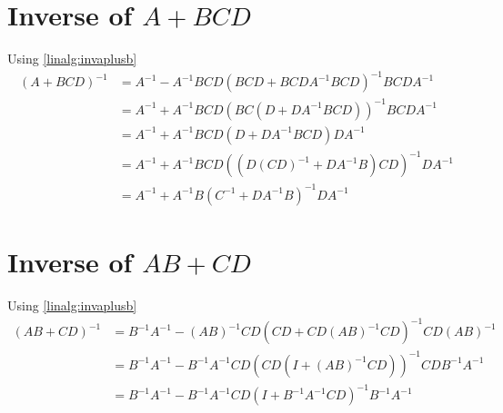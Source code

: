 \section{Inverse of $A+BCD$}
Using \eqref{linalg:invaplusb}
\begin{align}
(A+BCD)^{-1} &= A^{-1}-A^{-1}BCD(BCD + BCDA^{-1}BCD)^{-1}BCDA^{-1} \nonumber \\
&= A^{-1} + A^{-1}BCD(BC(D+DA^{-1}BCD))^{-1}BCDA^{-1} \nonumber \\
&= A^{-1} + A^{-1}BCD(D+DA^{-1}BCD)DA^{-1} \nonumber \\
&= A^{-1} + A^{-1}BCD((D(CD)^{-1}+DA^{-1}B)CD)^{-1}DA^{-1} \nonumber \\
&= A^{-1} + A^{-1}B(C^{-1} + DA^{-1}B)^{-1}DA^{-1}
\end{align}

\section{Inverse of $AB+CD$}
Using \eqref{linalg:invaplusb}
\begin{align}
(AB+CD)^{-1} &= B^{-1}A^{-1} - (AB)^{-1}CD(CD+CD(AB)^{-1}CD)^{-1}CD(AB)^{-1} \nonumber \\
&= B^{-1}A^{-1} - B^{-1}A^{-1}CD(CD(I+(AB)^{-1}CD))^{-1}CDB^{-1}A^{-1} \nonumber \\
&= B^{-1}A^{-1} - B^{-1}A^{-1}CD(I+B^{-1}A^{-1}CD)^{-1}B^{-1}A^{-1}
\end{align}